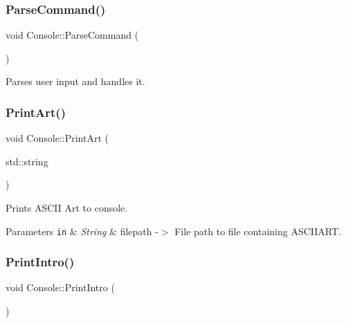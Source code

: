 \subsubsection{\texorpdfstring{Parse\+Command()}{ParseCommand()}}
{\footnotesize\ttfamily void Console\+::\+Parse\+Command (\begin{DoxyParamCaption}{ }\end{DoxyParamCaption})}



Parses user input and handles it. 

\mbox{\label{class_console_abec5429ffd3b6f4b6b9e575617941534}} 
\subsubsection{\texorpdfstring{Print\+Art()}{PrintArt()}}
{\footnotesize\ttfamily void Console\+::\+Print\+Art (\begin{DoxyParamCaption}\item[{std\+::string}]{ }\end{DoxyParamCaption})}



Prints A\+S\+C\+II Art to console. 


\begin{DoxyParams}[1]{Parameters}
\mbox{\tt in}  & {\em String} & filepath -\/$>$ File path to file containing A\+S\+C\+I\+I\+A\+RT. \\
\hline
\end{DoxyParams}
\mbox{\label{class_console_a65bd0080776d774e0328fbcc0e2654aa}} 
\subsubsection{\texorpdfstring{Print\+Intro()}{PrintIntro()}}
{\footnotesize\ttfamily void Console\+::\+Print\+Intro (\begin{DoxyParamCaption}{ }\end{DoxyParamCaption})}

\mbox{\label{class_console_aaf180b385dbda3c9d0e7edc19b72df72}} 
